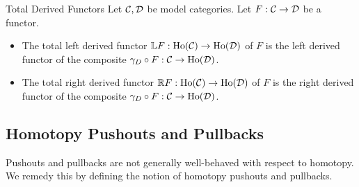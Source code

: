 \documentclass[a4paper]{article}
\begin{document}
\begin{defn}{Total Derived Functors}{} Let $\mathcal{C},\mathcal{D}$ be model categories. Let $F:\mathcal{C}\to\mathcal{D}$ be a functor. 
\begin{itemize}
\item The total left derived functor $\mathbb{L} F:\text{Ho}(\mathcal{C})\to\text{Ho}(\mathcal{D})$ of $F$ is the left derived functor of the composite $\gamma_D\circ F:\mathcal{C}\to\text{Ho}(\mathcal{D})$. 
\item The total right derived functor $\mathbb{R} F:\text{Ho}(\mathcal{C})\to\text{Ho}(\mathcal{D})$ of $F$ is the right derived functor of the composite $\gamma_D\circ F:\mathcal{C}\to\text{Ho}(\mathcal{D})$. 
\end{itemize}
\end{defn}

\subsection{Homotopy Pushouts and Pullbacks}
Pushouts and pullbacks are not generally well-behaved with respect to homotopy. We remedy this by defining the notion of homotopy pushouts and pullbacks. 
\end{document}
